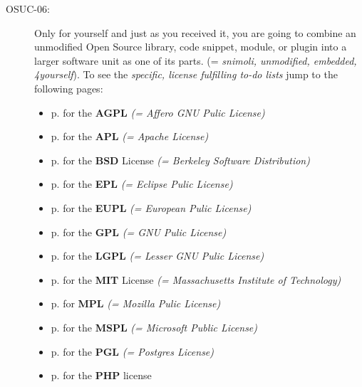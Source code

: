 \begin{description}
\item[OSUC-06:]\label{OSUC-06-DEF} Only for yourself and just as you received
it, you are going to combine an unmodified Open Source library, code snippet,
module, or plugin into a larger software unit as one of its parts. (=
\textit{snimoli, unmodified, embedded, 4yourself}).
To see the \textit{specific, license fulfilling to-do lists} jump to the
following pages:
   \begin{itemize}
    \item p. \pageref{OSUC-06-AGPL} for the \textbf{AGPL}
      \textit{(= Affero GNU Pulic License)} 
    \item p. \pageref{OSUC-06-Apache20} for the \textbf{APL}
      \textit{(= Apache License)}
    \item p. \pageref{OSUC-06-BSD} for the \textbf{BSD} License
      \textit{(= Berkeley Software Distribution)}
    \item p. \pageref{OSUC-06-EPL} for the \textbf{EPL}
      \textit{(= Eclipse Pulic License)}     
    \item p. \pageref{OSUC-06-EUPL} for the \textbf{EUPL}
      \textit{(= European Pulic License)} 
    \item p. \pageref{OSUC-06-GPL} for the \textbf{GPL}
       \textit{(= GNU Pulic License)} 
    \item p. \pageref{OSUC-06-LGPL} for the \textbf{LGPL}
      \textit{(= Lesser GNU Pulic License)}           
    \item p. \pageref{OSUC-06-MIT} for the \textbf{MIT} License
       \textit{(= Massachusetts Institute of Technology)} 
    \item p. \pageref{OSUC-06-MPL} for \textbf{MPL}
      \textit{(= Mozilla Pulic License)}     
    \item p. \pageref{OSUC-06-MsPL} for the \textbf{MSPL}
      \textit{(= Microsoft Public License)} 
    \item p. \pageref{OSUC-06-PGL} for the \textbf{PGL}
      \textit{(= Postgres License)} 
    \item p. \pageref{OSUC-06-PHP} for the \textbf{PHP} license 
  \end{itemize}


\end{description}
